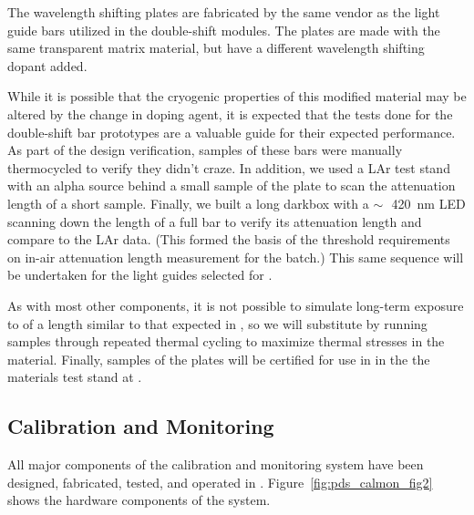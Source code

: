 The  wavelength shifting plates are fabricated by the same vendor as the light guide bars utilized in the double-shift  modules.  The plates are made with the same transparent matrix material, but have a different wavelength shifting dopant added.  

While it is possible that the cryogenic properties of this modified  material may be altered by the change in doping agent, it is expected that the tests done for the double-shift bar prototypes are a valuable guide for their expected performance.  As part of the design verification, samples of these bars were manually thermocycled to verify they didn't craze. In addition, we used 
a LAr test stand 
with an alpha source behind a small sample of the  plate to scan the attenuation length of a short sample. Finally, we built a long darkbox with a $\sim\,$~\SI{420}{nm} LED scanning down the length of a full bar to verify its attenuation length and compare to the LAr data. (This formed the basis of the threshold requirements on in-air attenuation length measurement for the  batch.) 
This same sequence will be undertaken for the light guides selected for . 

As with most other components, it is not possible to simulate long-term exposure to  of a length similar to that expected in , so we will substitute by running samples through repeated thermal cycling to maximize thermal stresses in the material.  Finally, samples of the  plates will be certified for use in  in the the materials test stand at .  



\subsection{Calibration and Monitoring}
\label{sec:fdsp-pd-validation-candm}


All major components of the   calibration and monitoring system have been designed, fabricated, tested, and operated in .
Figure~\ref{fig:pds_calmon_fig2} shows the hardware components of the system.

